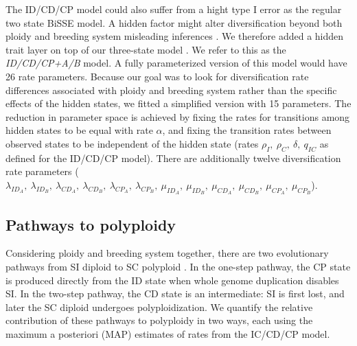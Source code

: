 The ID/CD/CP model could also suffer from a hight type I error as the regular two state BiSSE model. 
A hidden factor might alter diversification beyond both ploidy and breeding system misleading inferences \citep{rabosky_2015}.
We therefore added a hidden trait layer on top of our three-state model \citep[analogous to][]{caetano_2018,  huang_2018}.
We refer to this as the \textit{ID/CD/CP+A/B} model.
A fully parameterized version of this model would have 26 rate parameters. 
Because our goal was to look for diversification rate differences associated with ploidy and breeding system rather than the specific effects of the hidden states, we fitted a simplified version with 15 parameters.
The reduction in parameter space is achieved by fixing the rates for transitions among hidden states to be equal with rate $\alpha$, and fixing the transition rates between observed states to be independent of the hidden state (rates $\rho_I,\ \rho_C,\ \delta,\ q_{IC}$ as defined for the ID/CD/CP model).
There are additionally twelve diversification rate parameters ($\lambda_{ID_A},\ \lambda_{ID_B},\ \lambda_{CD_A},\ \lambda_{CD_B},\ \lambda_{CP_A},\ \lambda_{CP_B},\ \mu_{ID_A},\ \mu_{ID_B},\ \mu_{CD_A},\ \mu_{CD_B},\ \mu_{CP_A},\ \mu_{CP_B}$).

\subsection{Pathways to polyploidy}

Considering ploidy and breeding system together, there are two evolutionary pathways from SI diploid to SC polyploid \citep{brunet2001, robertson_2011}.
In the one-step pathway, the CP state is produced directly from the ID state when whole genome duplication disables SI.
In the two-step pathway, the CD state is an intermediate: SI is first lost, and later the SC diploid undergoes polyploidization.
We quantify the relative contribution of these pathways to polyploidy in two ways, each using the maximum a posteriori (MAP) estimates of rates from the IC/CD/CP model.


